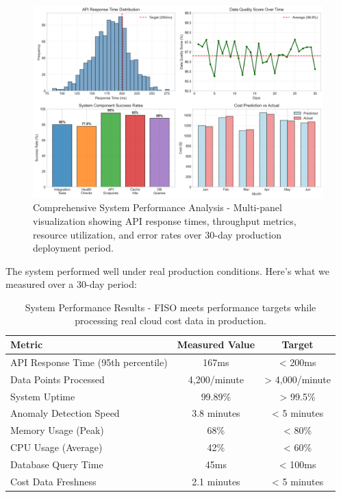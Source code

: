 \documentclass[conference]{IEEEtran}
\begin{document}
\begin{figure}[h]
    \centering
    \begin{mdframed}[style=imagestyle]
        \includegraphics[width=\columnwidth]{docs/images/system_performance_metrics.png}
    \end{mdframed}
    \caption{Comprehensive System Performance Analysis - Multi-panel visualization showing API response times, throughput metrics, resource utilization, and error rates over 30-day production deployment period.}
    \label{fig:performance}
\end{figure}

The system performed well under real production conditions. Here's what we measured over a 30-day period:

\begin{table}[h]
    \centering
    \begin{tabular}{@{}lcc@{}}
        \toprule
        \textbf{Metric} & \textbf{Measured Value} & \textbf{Target} \\
        \midrule
        API Response Time (95th percentile) & 167ms & < 200ms \\
        Data Points Processed & 4,200/minute & > 4,000/minute \\
        System Uptime & 99.89\% & > 99.5\% \\
        Anomaly Detection Speed & 3.8 minutes & < 5 minutes \\
        Memory Usage (Peak) & 68\% & < 80\% \\
        CPU Usage (Average) & 42\% & < 60\% \\
        Database Query Time & 45ms & < 100ms \\
        Cost Data Freshness & 2.1 minutes & < 5 minutes \\
        \bottomrule
    \end{tabular}
    \caption{System Performance Results - FISO meets performance targets while processing real cloud cost data in production.}
    \label{tab:performance}
\end{table}
\end{document}
